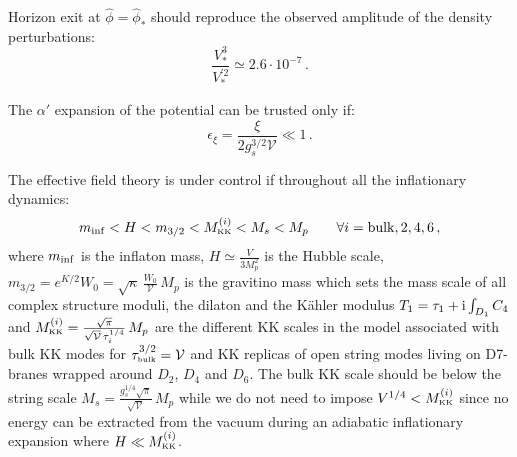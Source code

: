\documentclass[11pt,a4paper]{article}
\newcommand{\be}{\begin{equation}}
\newcommand{\ee}{\end{equation}}
\def\b{{\scriptscriptstyle \rm bulk}}
\def\KK{{\scriptscriptstyle \rm KK}}
\newcommand\vo{{\mathcal{V}}}
\begin{document}
\item Horizon exit at $\hat\phi=\hat\phi_*$ should reproduce the observed amplitude of the density perturbations:
\be
\frac{V_*^3}{V_*^{'2}} \simeq 2.6 \cdot 10^{-7}\,.
\label{COBE}
\ee

\item The $\alpha'$ expansion of the potential can be trusted only if:
\be
\epsilon_\xi = \frac{\xi}{2 g_s^{3/2} \vo} \ll 1\,.
\ee

\item The effective field theory is under control if throughout all the inflationary dynamics:
\be
m_{\rm inf} < H < m_{3/2} < M_\KK^{(i)} < M_s < M_p \qquad\forall i = {\rm bulk},2,4,6\,,
\label{Hierarchies}
\ee
where $m_{\rm inf}$ is the inflaton mass, $H\simeq \frac{V}{3 M_p^2}$ is the Hubble scale, $m_{3/2} = e^{K/2} W_0 = \sqrt{\kappa} \,\frac{W_0}{\vo}\,M_p$ is the gravitino mass which sets the mass scale of all complex structure moduli, the dilaton and the K\"ahler modulus $T_1 = \tau_1 + {\rm i}\int_{D_1} C_4$ and $M_\KK^{(i)} = \frac{\sqrt{\pi}}{\sqrt{\vo}\,\tau_i^{1/4}}\,M_p$ are the different KK scales in the model associated with bulk KK modes for $\tau_\b^{3/2} = \vo$ and KK replicas of open string modes living on D7-branes wrapped around $D_2$, $D_4$ and $D_6$. The bulk KK scale should be below the string scale $M_s = \frac{g_s^{1/4} \sqrt{\pi}}{\sqrt{\vo}}\,M_p$ while we do not need to impose $V^{1/4} < M_\KK^{(i)}$ since no energy can be extracted from the vacuum during an adiabatic inflationary expansion where $H\ll M_\KK^{(i)}$. 
\end{document}
